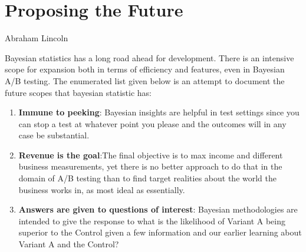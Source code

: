 \chapter{Proposing the Future}
\begin{epigraphs}
        {Abraham Lincoln}
\end{epigraphs}
Bayesian statistics has a long road ahead for development. There is an intensive scope for expansion both in terms of efficiency and features, even in Bayesian A/B testing. The enumerated list given below is an attempt to document the future scopes that bayesian statistic has:
\begin{enumerate}
\item \textbf{Immune to peeking}: Bayesian insights are helpful in test settings since you can stop a test at whatever point you please and the outcomes will in any case be substantial.
\item \textbf{Revenue is the goal}:The final objective is to max income and different business measurements, yet there is no better approach to do that in the domain of A/B testing than to find target realities about the world the business works in, as most ideal as essentially.
\item \textbf{Answers are given to questions of interest}: Bayesian methodologies are intended to give the response to what is the likelihood of Variant A being superior to the Control given a few information and our earlier learning about Variant A and the Control?
\end{enumerate}

